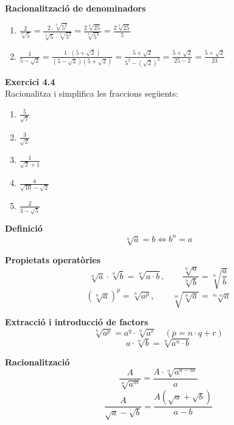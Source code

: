 \documentclass[12pt]{article}
\begin{document}
\begin{exemple}
\textbf{Racionalització de denominadors}
\begin{enumerate}[label=\alph*)]
    \item $\frac{2}{\sqrt[3]{5}} = \frac{2 \cdot \sqrt[3]{5^2}}{\sqrt[3]{5} \cdot \sqrt[3]{5^2}} = \frac{2\sqrt[3]{25}}{\sqrt[3]{5^3}} = \frac{2\sqrt[3]{25}}{5}$
    \item $\frac{1}{5 - \sqrt{2}} = \frac{1 \cdot (5 + \sqrt{2})}{(5 - \sqrt{2})(5 + \sqrt{2})} = \frac{5 + \sqrt{2}}{5^2 - (\sqrt{2})^2} = \frac{5 + \sqrt{2}}{25 - 2} = \frac{5 + \sqrt{2}}{23}$
\end{enumerate}
\end{exemple}

\begin{exercici}
\textbf{Exercici 4.4}\\
Racionalitza i simplifica les fraccions següents:
\begin{enumerate}[label=\alph*)]
    \item $\frac{5}{\sqrt{7}}$
    \item $\frac{3}{\sqrt{2}}$
    \item $\frac{1}{\sqrt{2} + 1}$
    \item $\frac{4}{\sqrt{10} - \sqrt{2}}$
    \item $\frac{2}{3 - \sqrt{5}}$
\end{enumerate}
\end{exercici}

\begin{resum}[title=Resum del Tema 4: Radicals]
\textbf{Definició}
\[
\sqrt[n]{a} = b \iff b^n = a
\]

\textbf{Propietats operatòries}
\[
\sqrt[n]{a} \cdot \sqrt[n]{b} = \sqrt[n]{a \cdot b}, \qquad
\frac{\sqrt[n]{a}}{\sqrt[n]{b}} = \sqrt[n]{\frac{a}{b}}
\]
\[
(\sqrt[n]{a})^p = \sqrt[n]{a^p}, \qquad
\sqrt[m]{\sqrt[n]{a}} = \sqrt[m \cdot n]{a}
\]

\textbf{Extracció i introducció de factors}
\[
\sqrt[n]{a^p} = a^q \cdot \sqrt[n]{a^r} \quad (p = n \cdot q + r)
\]
\[
a \cdot \sqrt[n]{b} = \sqrt[n]{a^n \cdot b}
\]

\textbf{Racionalització}
\[
\frac{A}{\sqrt[n]{a^m}} = \frac{A \cdot \sqrt[n]{a^{n-m}}}{a}
\]
\[
\frac{A}{\sqrt{a} - \sqrt{b}} = \frac{A(\sqrt{a} + \sqrt{b})}{a - b}
\]
\end{resum}
\end{document}
